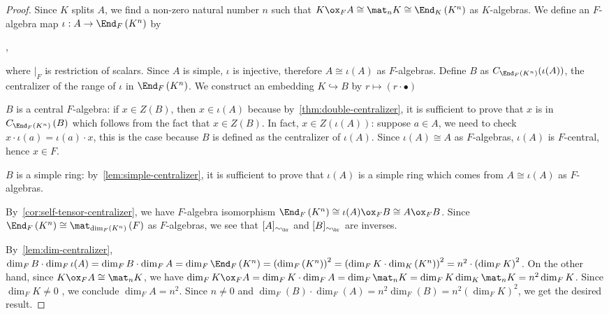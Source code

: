 \begin{proof}
   Since $K$ splits $A$, we find a non-zero natural number $n$ such that $K\ox_{F}A\cong\mat_{n}K\cong\End_{K}\left(K^{n}\right)$ as $K$-algebras.
   We define an $F$-algebra map $\iota: A\to\End_{F}\left(K^{n}\right)$ by
   \begin{center}
     ,
   \end{center}
   where $|_{F}$ is restriction of scalars. Since $A$ is simple, $\iota$ is injective, therefore $A \cong \iota(A)$ as $F$-algebras. Define $B$ as $C_{\End_{F}\left(K^{n}\right)}(\iota(A))$, the centralizer of the range of $\iota$ in $\End_{F}\left(K^{n}\right)$.
   We construct an embedding $K \hookrightarrow B$ by $r \mapsto (r \cdot \bullet)$

   $B$ is a central $F$-algebra: if $x \in Z(B)$, then $x \in \iota(A)$ because by~\cref{thm:double-centralizer}, it is sufficient to prove that $x$ is in $C_{\End_{F}\left(K^{n}\right)}\left(B\right)$ which follows from the fact that $x \in Z(B)$. In fact, $x \in Z(\iota(A))$: suppose $a \in A$, we need to check $x \cdot \iota(a) = \iota(a)\cdot x$, this is the case because $B$ is defined as the centralizer of $\iota(A)$. Since $\iota(A) \cong A$ as $F$-algebras, $\iota(A)$ is $F$-central, hence $x \in F$.

   $B$ is a simple ring: by~\cref{lem:simple-centralizer}, it is sufficient to prove that $\iota(A)$ is a simple ring which comes from $A \cong \iota(A)$ as $F$-algebras.

   By~\cref{cor:self-tensor-centralizer}, we have $F$-algebra isomorphism $\End_{F}\left(K^{n}\right)\cong \iota(A)\ox_{F}B \cong A \ox_{F}B$. Since $\End_{F}\left(K^{n}\right)\cong\mat_{\dim_{F}\left(K^{n}\right)}\left(F\right)$ as $F$-algebras, we see that $[A]_{\sim_{\br}}$ and $[B]_{\sim_{\br}}$ are inverses.

   By~\cref{lem:dim-centralizer}, $\dim_{F}B\cdot \dim_{F}\iota(A) = \dim_{F}B\cdot\dim_{F}A = \dim_{F}\End_{F}\left(K^{n}\right) = {\left(\dim_{F}\left(K^{n}\right)\right)}^{2}={\left(\dim_{F}K\cdot \dim_{K}\left(K^{n}\right)\right)}^{2}=n^{2}\cdot{\left(\dim_{F}K\right)}^{2}$. On the other hand, since $K\ox_{F}A\cong\mat_{n}K$, we have $\dim_{F}K\ox_{F}A=\dim_{F}K\cdot\dim_{F}A=\dim_{F}\mat_{n}K=\dim_{F}K\dim_{K}\mat_{n}K=n^{2}\dim_{F}K$. Since $\dim_{F}K\ne 0$ , we conclude $\dim_{F}A=n^{2}$. Since $n\ne 0$ and $\dim_{F}(B)\cdot \dim_{F}(A)=n^{2}\dim_{F}(B)=n^{2}{\left(\dim_{F}K\right)}^{2}$, we get the desired result.

 \end{proof}


